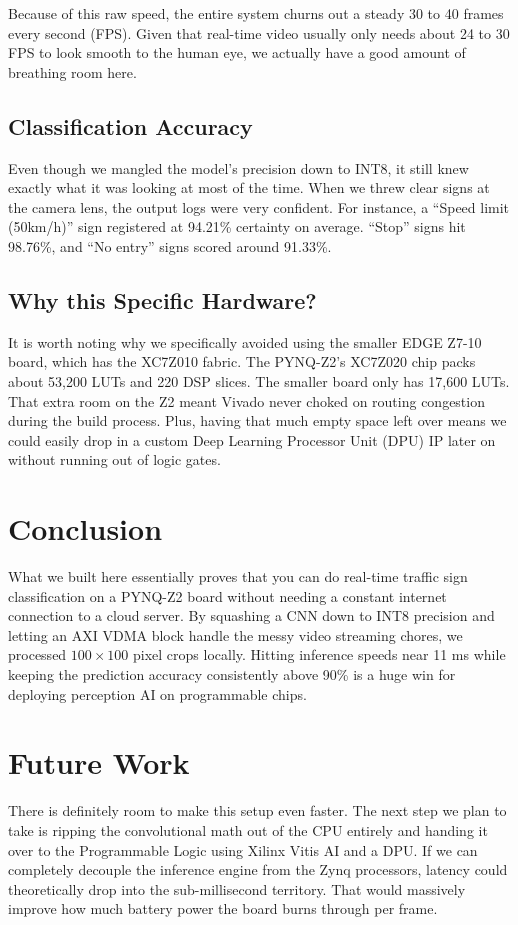 \documentclass[conference]{IEEEtran}
\begin{document}
Because of this raw speed, the entire system churns out a steady 30 to 40 frames every second (FPS). Given that real-time video usually only needs about 24 to 30 FPS to look smooth to the human eye, we actually have a good amount of breathing room here.

\subsection{Classification Accuracy}
Even though we mangled the model's precision down to INT8, it still knew exactly what it was looking at most of the time. When we threw clear signs at the camera lens, the output logs were very confident. For instance, a ``Speed limit (50km/h)'' sign registered at 94.21\% certainty on average. ``Stop'' signs hit 98.76\%, and ``No entry'' signs scored around 91.33\%. 

\subsection{Why this Specific Hardware?}
It is worth noting why we specifically avoided using the smaller EDGE Z7-10 board, which has the XC7Z010 fabric. The PYNQ-Z2's XC7Z020 chip packs about 53,200 LUTs and 220 DSP slices. The smaller board only has 17,600 LUTs. That extra room on the Z2 meant Vivado never choked on routing congestion during the build process. Plus, having that much empty space left over means we could easily drop in a custom Deep Learning Processor Unit (DPU) IP later on without running out of logic gates.

\section{Conclusion}
What we built here essentially proves that you can do real-time traffic sign classification on a PYNQ-Z2 board without needing a constant internet connection to a cloud server. By squashing a CNN down to INT8 precision and letting an AXI VDMA block handle the messy video streaming chores, we processed $100 \times 100$ pixel crops locally. Hitting inference speeds near 11 ms while keeping the prediction accuracy consistently above 90\% is a huge win for deploying perception AI on programmable chips.

\section{Future Work}
There is definitely room to make this setup even faster. The next step we plan to take is ripping the convolutional math out of the CPU entirely and handing it over to the Programmable Logic using Xilinx Vitis AI and a DPU. If we can completely decouple the inference engine from the Zynq processors, latency could theoretically drop into the sub-millisecond territory. That would massively improve how much battery power the board burns through per frame.
\end{document}
